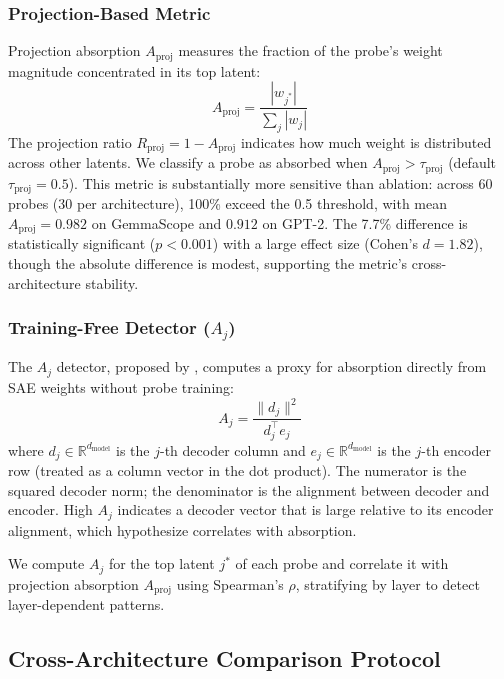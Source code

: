 \documentclass{article}
\begin{document}
\subsubsection{Projection-Based Metric}

Projection absorption $A_{\text{proj}}$ measures the fraction of the probe's weight magnitude concentrated in its top latent:
\begin{equation}
A_{\text{proj}} = \frac{|w_{j^*}|}{\sum_j |w_j|}
\end{equation}
The projection ratio $R_{\text{proj}} = 1 - A_{\text{proj}}$ indicates how much weight is distributed across other latents. We classify a probe as absorbed when $A_{\text{proj}} > \tau_{\text{proj}}$ (default $\tau_{\text{proj}} = 0.5$). This metric is substantially more sensitive than ablation: across 60 probes (30 per architecture), 100\% exceed the 0.5 threshold, with mean $A_{\text{proj}} = 0.982$ on GemmaScope and $0.912$ on GPT-2. The 7.7\% difference is statistically significant ($p < 0.001$) with a large effect size (Cohen's $d = 1.82$), though the absolute difference is modest, supporting the metric's cross-architecture stability.

\subsubsection{Training-Free Detector ($A_j$)}
\label{sec:aj_detector}

The $A_j$ detector, proposed by \citet{chanin2024feature}, computes a proxy for absorption directly from SAE weights without probe training:
\begin{equation}
A_j = \frac{\|d_j\|^2}{d_j^\top e_j}
\end{equation}
where $d_j \in \mathbb{R}^{d_{\text{model}}}$ is the $j$-th decoder column and $e_j \in \mathbb{R}^{d_{\text{model}}}$ is the $j$-th encoder row (treated as a column vector in the dot product). The numerator is the squared decoder norm; the denominator is the alignment between decoder and encoder. High $A_j$ indicates a decoder vector that is large relative to its encoder alignment, which \citet{chanin2024feature} hypothesize correlates with absorption.

We compute $A_j$ for the top latent $j^*$ of each probe and correlate it with projection absorption $A_{\text{proj}}$ using Spearman's $\rho$, stratifying by layer to detect layer-dependent patterns.

\subsection{Cross-Architecture Comparison Protocol}
\end{document}
